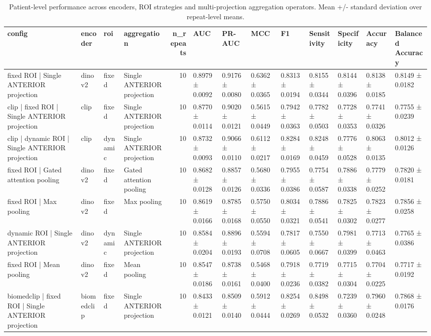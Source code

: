 \begin{table}
\caption{Patient-level performance across encoders, ROI strategies and multi-projection aggregation operators. Mean +/- standard deviation over repeat-level means.}
\label{tab:phase4-main}
\begin{tabular}{llllrllllllll}
\toprule
config & encoder & roi & aggregation & n\_repeats & AUC & PR-AUC & MCC & F1 & Sensitivity & Specificity & Accuracy & Balanced Accuracy \\
\midrule
fixed ROI | Single ANTERIOR projection & dinov2 & fixed & Single ANTERIOR projection & 10 & 0.8979 ± 0.0092 & 0.9176 ± 0.0080 & 0.6362 ± 0.0365 & 0.8313 ± 0.0194 & 0.8155 ± 0.0344 & 0.8144 ± 0.0396 & 0.8138 ± 0.0185 & 0.8149 ± 0.0182 \\
clip | fixed ROI | Single ANTERIOR projection & clip & fixed & Single ANTERIOR projection & 10 & 0.8770 ± 0.0114 & 0.9020 ± 0.0121 & 0.5615 ± 0.0449 & 0.7942 ± 0.0363 & 0.7782 ± 0.0503 & 0.7728 ± 0.0353 & 0.7741 ± 0.0326 & 0.7755 ± 0.0239 \\
clip | dynamic ROI | Single ANTERIOR projection & clip & dynamic & Single ANTERIOR projection & 10 & 0.8732 ± 0.0093 & 0.9066 ± 0.0110 & 0.6112 ± 0.0217 & 0.8284 ± 0.0169 & 0.8248 ± 0.0459 & 0.7776 ± 0.0528 & 0.8063 ± 0.0135 & 0.8012 ± 0.0126 \\
fixed ROI | Gated attention pooling & dinov2 & fixed & Gated attention pooling & 10 & 0.8682 ± 0.0128 & 0.8857 ± 0.0126 & 0.5680 ± 0.0336 & 0.7955 ± 0.0386 & 0.7754 ± 0.0587 & 0.7886 ± 0.0338 & 0.7779 ± 0.0252 & 0.7820 ± 0.0181 \\
fixed ROI | Max pooling & dinov2 & fixed & Max pooling & 10 & 0.8619 ± 0.0166 & 0.8785 ± 0.0168 & 0.5750 ± 0.0550 & 0.8034 ± 0.0321 & 0.7886 ± 0.0541 & 0.7825 ± 0.0302 & 0.7823 ± 0.0277 & 0.7856 ± 0.0258 \\
dynamic ROI | Single ANTERIOR projection & dinov2 & dynamic & Single ANTERIOR projection & 10 & 0.8584 ± 0.0204 & 0.8896 ± 0.0193 & 0.5594 ± 0.0708 & 0.7817 ± 0.0605 & 0.7550 ± 0.0667 & 0.7981 ± 0.0399 & 0.7713 ± 0.0463 & 0.7765 ± 0.0386 \\
fixed ROI | Mean pooling & dinov2 & fixed & Mean pooling & 10 & 0.8547 ± 0.0186 & 0.8738 ± 0.0161 & 0.5468 ± 0.0400 & 0.7918 ± 0.0236 & 0.7719 ± 0.0382 & 0.7715 ± 0.0304 & 0.7704 ± 0.0225 & 0.7717 ± 0.0192 \\
biomedclip | fixed ROI | Single ANTERIOR projection & biomedclip & fixed & Single ANTERIOR projection & 10 & 0.8433 ± 0.0121 & 0.8509 ± 0.0140 & 0.5912 ± 0.0444 & 0.8254 ± 0.0269 & 0.8498 ± 0.0532 & 0.7239 ± 0.0360 & 0.7960 ± 0.0248 & 0.7868 ± 0.0176 \\

\end{tabular}
\end{table}
